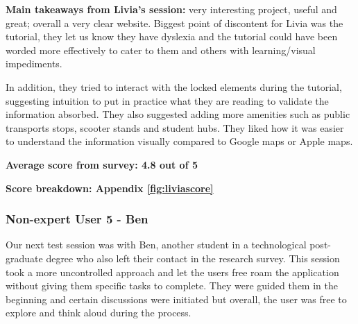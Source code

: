\textbf{Main takeaways from Livia's session: }very interesting project,
useful and great; overall a very clear website. Biggest point of discontent for
Livia was the tutorial, they let us know they have dyslexia and the tutorial
could have been worded more effectively to cater to them and others with
learning/visual impediments.

In addition, they tried to interact with the locked elements during the
tutorial, suggesting intuition to put in practice what they are reading to
validate the information absorbed. They also suggested adding more amenities
such as public transports stops, scooter stands and student hubs. They liked how
it was easier to understand the information visually compared to Google maps or
Apple maps.

\textbf{Average score from survey: 4.8 out of 5}

\hspace{2em}\textbf{Score breakdown: Appendix \ref{fig:liviascore}}

\newpage{}

\subsubsection{Non-expert User 5 - Ben}
Our next test session was with Ben, another student in a technological
post-graduate degree who also left their contact in the research survey. This
session took a more uncontrolled approach and let the users free roam the
application without giving them specific tasks to complete. They were guided
them in the beginning and certain discussions were initiated but overall, the
user was free to explore and think aloud during the process.

